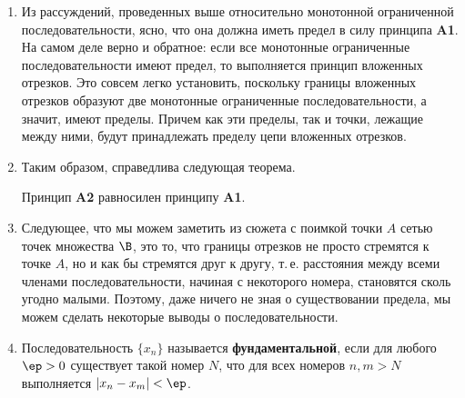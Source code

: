 \begin{enumerate}
Поэтому всегда очень важно указывать, при каком изменении какого параметра ищется предел.

\subsection*{A2. Предел монотонной последовательности}

\noindent
\textbf{Формулировка}: \textit{Всякая монотонная ограниченная последовательность имеет предел}.\footnote{Если быть точным, то еще требуется архимедовость системы чисел, в которой этот принцип постулируется, но для числовой прямой, в которой множество $\Z$ не ограничено ни сверху, ни снизу, это выполняется автоматически.}

\item Из рассуждений, проведенных выше относительно монотонной ограниченной последовательности, ясно, что она должна иметь предел в силу принципа \textbf{A1}. На самом деле верно и обратное: если все монотонные ограниченные последовательности имеют предел, то выполняется принцип вложенных отрезков. Это совсем легко установить, поскольку границы вложенных отрезков образуют две монотонные ограниченные последовательности, а значит, имеют пределы. Причем как эти пределы, так и точки, лежащие между ними, будут принадлежать пределу цепи вложенных отрезков.

\item Таким образом, справедлива следующая теорема.

\begin{thrm} Принцип \textbf{A2} равносилен принципу \textbf{A1}.\end{thrm}




\item Следующее, что мы можем заметить из сюжета с поимкой точки $A$ сетью точек множества $\B$, это то, что границы отрезков не просто стремятся к точке $A$, но и как бы стремятся друг к другу, т.\,е. расстояния между всеми членами последовательности, начиная с некоторого номера, становятся сколь угодно малыми. Поэтому, даже ничего не зная о существовании предела, мы можем сделать некоторые выводы о последовательности.
\item Последовательность $\{x_n\}$ называется \textbf{фундаментальной}, если для любого $\ep>0$ существует такой номер $N$, что для всех номеров $n,m>N$ выполняется $|x_n-x_m|<\ep$.




\end{enumerate}

